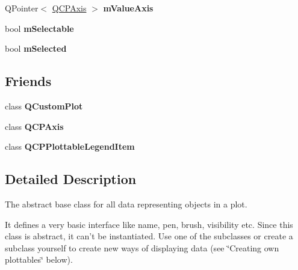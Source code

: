 \begin{DoxyCompactItemize}
\item 
\hypertarget{classQCPAbstractPlottable_a2901452ca4aea911a1827717934a4bda}{\-Q\-Pointer$<$ \hyperlink{classQCPAxis}{\-Q\-C\-P\-Axis} $>$ {\bfseries m\-Value\-Axis}}\label{classQCPAbstractPlottable_a2901452ca4aea911a1827717934a4bda}

\item 
\hypertarget{classQCPAbstractPlottable_aceee52342c8e75727abcbd164986fdcb}{bool {\bfseries m\-Selectable}}\label{classQCPAbstractPlottable_aceee52342c8e75727abcbd164986fdcb}

\item 
\hypertarget{classQCPAbstractPlottable_a43f68a0603e9bcd016bdfa6d9d5c41c9}{bool {\bfseries m\-Selected}}\label{classQCPAbstractPlottable_a43f68a0603e9bcd016bdfa6d9d5c41c9}

\end{DoxyCompactItemize}
\subsection*{\-Friends}
\begin{DoxyCompactItemize}
\item 
\hypertarget{classQCPAbstractPlottable_a1cdf9df76adcfae45261690aa0ca2198}{class {\bfseries \-Q\-Custom\-Plot}}\label{classQCPAbstractPlottable_a1cdf9df76adcfae45261690aa0ca2198}

\item 
\hypertarget{classQCPAbstractPlottable_af123edeca169ec7a31958a1d714e1a8a}{class {\bfseries \-Q\-C\-P\-Axis}}\label{classQCPAbstractPlottable_af123edeca169ec7a31958a1d714e1a8a}

\item 
\hypertarget{classQCPAbstractPlottable_a104c78e91302afd6842a903e472f552f}{class {\bfseries \-Q\-C\-P\-Plottable\-Legend\-Item}}\label{classQCPAbstractPlottable_a104c78e91302afd6842a903e472f552f}

\end{DoxyCompactItemize}


\subsection{\-Detailed \-Description}
\-The abstract base class for all data representing objects in a plot. 

\-It defines a very basic interface like name, pen, brush, visibility etc. \-Since this class is abstract, it can't be instantiated. \-Use one of the subclasses or create a subclass yourself to create new ways of displaying data (see \char`\"{}\-Creating own plottables\char`\"{} below).


